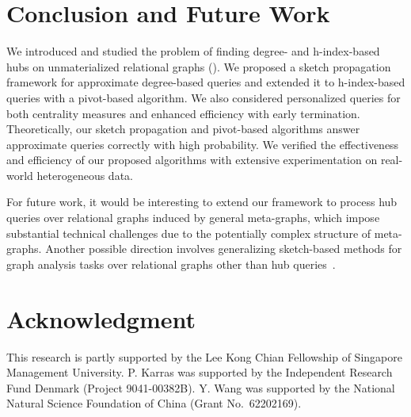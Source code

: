 \section{Conclusion and Future Work}\label{sec:Conclusion}

We introduced and studied the problem of finding degree- and h-index-based hubs on unmaterialized relational graphs (\ced). We proposed a sketch propagation framework for approximate degree-based \ced queries and extended it to h-index-based \ced queries with a pivot-based algorithm. We also considered personalized \ced queries for both centrality measures and enhanced efficiency with early termination. Theoretically, our sketch propagation and pivot-based algorithms answer approximate \ced queries correctly with high probability. We verified the effectiveness and efficiency of our proposed algorithms with extensive experimentation on real-world heterogeneous data.

For future work, it would be interesting to extend our framework to process hub queries over relational graphs induced by general meta-graphs, which impose substantial technical challenges due to the potentially complex structure of meta-graphs. Another possible direction involves generalizing sketch-based methods for graph analysis tasks over relational graphs other than hub queries~\cite{niu2025sans}.

\section*{Acknowledgment}
This research is partly supported by the Lee Kong Chian Fellowship of Singapore Management University.
P. Karras was supported by the Independent Research Fund Denmark (Project 9041-00382B).
Y. Wang was supported by the National Natural Science Foundation of China (Grant No.~62202169).